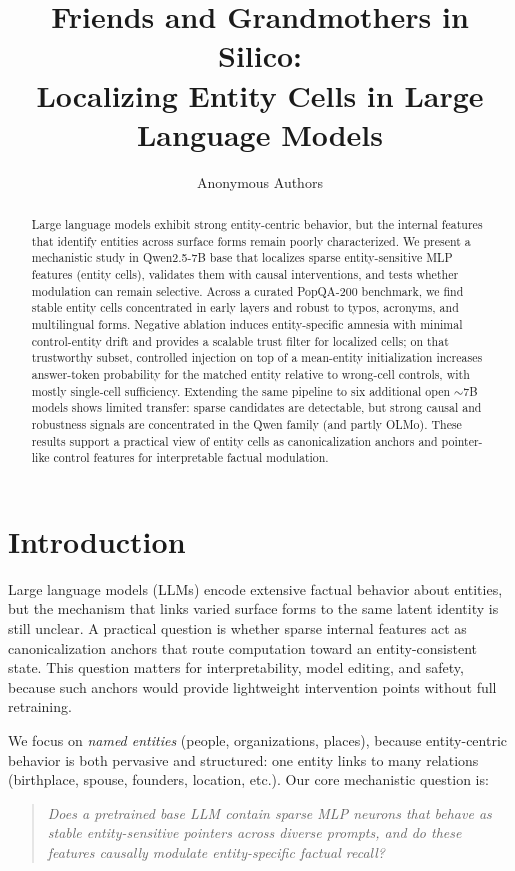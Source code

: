 \documentclass[10pt,twocolumn]{article}
\title{Friends and Grandmothers in Silico: \\ Localizing Entity Cells in Large Language Models}
\author{Anonymous Authors}
\date{}
\begin{document}
\maketitle

\begin{abstract}
Large language models exhibit strong entity-centric behavior, but the internal features that identify entities across surface forms remain poorly characterized. We present a mechanistic study in Qwen2.5-7B base that localizes sparse entity-sensitive MLP features (entity cells), validates them with causal interventions, and tests whether modulation can remain selective. Across a curated PopQA-200 benchmark, we find stable entity cells concentrated in early layers and robust to typos, acronyms, and multilingual forms. Negative ablation induces entity-specific amnesia with minimal control-entity drift and provides a scalable trust filter for localized cells; on that trustworthy subset, controlled injection on top of a mean-entity initialization increases answer-token probability for the matched entity relative to wrong-cell controls, with mostly single-cell sufficiency. Extending the same pipeline to six additional open $\sim$7B models shows limited transfer: sparse candidates are detectable, but strong causal and robustness signals are concentrated in the Qwen family (and partly OLMo). These results support a practical view of entity cells as canonicalization anchors and pointer-like control features for interpretable factual modulation.
\end{abstract}

\section{Introduction}
Large language models (LLMs) encode extensive factual behavior about entities, but the mechanism that links varied surface forms to the same latent identity is still unclear. A practical question is whether sparse internal features act as canonicalization anchors that route computation toward an entity-consistent state. This question matters for interpretability, model editing, and safety, because such anchors would provide lightweight intervention points without full retraining.

We focus on \emph{named entities} (people, organizations, places), because entity-centric behavior is both pervasive and structured: one entity links to many relations (birthplace, spouse, founders, location, etc.). Our core mechanistic question is:
\begin{quote}
\small \emph{Does a pretrained base LLM contain sparse MLP neurons that behave as stable entity-sensitive pointers across diverse prompts, and do these features causally modulate entity-specific factual recall?}
\end{quote}
\end{document}
